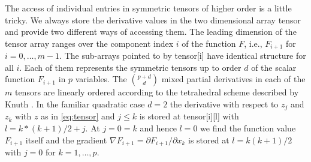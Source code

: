 \documentclass[11pt,twoside]{article}
\begin{document}
The access of individual entries in symmetric tensors of
higher order is a little tricky. We always store the derivative
values in the two dimensional array {\sf tensor} and provide two 
different ways of accessing them.  
The leading dimension of the tensor array ranges over 
the component index $i$ of the function $F$, i.e., $F_{i+1}$ for $i =
0,\ldots,m-1$. The sub-arrays pointed to by {\sf tensor[i]} have identical
structure for all $i$. Each of them represents the symmetric tensors up to
order $d$ of the scalar function $F_{i+1}$ in $p$ variables.  
%
The $\binom{p+d}{d}$ mixed partial derivatives in each of the $m$
tensors are linearly ordered according to the tetrahedral 
scheme described by Knuth \cite{Knuth73}. In the familiar quadratic 
case $d=2$ the derivative with respect to $z_j$ and $z_k$ with $z$ 
as in \eqref{eq:tensor} and $j \leq k$ is stored at {\sf tensor[i][l]} with 
$l = k*(k+1)/2+j$. At $j = 0 = k$ and hence $l = 0$ we find the
function value $F_{i+1}$ itself and the gradient 
$\nabla F_{i+1}= \partial F_{i+1}/\partial x_k $ is stored at $l=k(k+1)/2$
with $j=0$ for $k=1,\ldots,p$.
\end{document}
